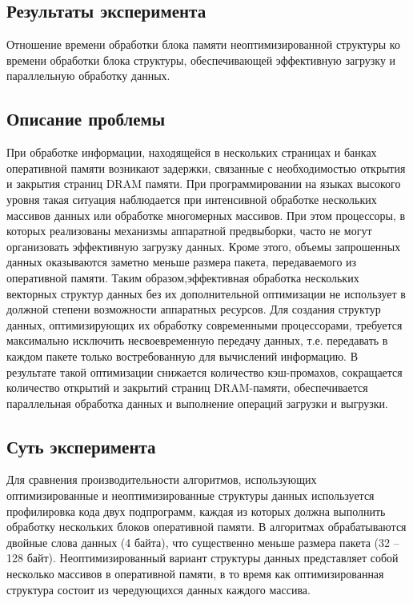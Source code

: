 \subsection{Результаты эксперимента}
Отношение времени обработки блока памяти неоптимизированной структуры ко
времени обработки блока структуры, обеспечивающей эффективную загрузку и
параллельную обработку данных.


\subsection{Описание проблемы}
При обработке информации, находящейся в нескольких страницах и банках
оперативной памяти возникают задержки, связанные с необходимостью открытия и
закрытия страниц DRAM памяти. При программировании на языках высокого уровня
такая ситуация наблюдается при интенсивной обработке нескольких массивов данных
или обработке многомерных массивов. При этом процессоры, в которых реализованы
механизмы аппаратной предвыборки, часто не могут организовать эффективную
загрузку данных. Кроме этого, объемы запрошенных данных оказываются заметно
меньше размера пакета, передаваемого из оперативной памяти. Таким
образом,эффективная обработка нескольких векторных структур данных без их
дополнительной оптимизации не использует в должной степени возможности
аппаратных ресурсов. Для создания структур данных, оптимизирующих их обработку
современными процессорами, требуется максимально исключить несвоевременную
передачу данных, т.е. передавать в каждом пакете только востребованную для
вычислений информацию. В результате такой оптимизации снижается количество
кэш-промахов, сокращается количество открытий и закрытий страниц  DRAM-памяти,
обеспечивается параллельная обработка данных и выполнение операций загрузки и
выгрузки.

\subsection{Суть эксперимента}  
Для сравнения производительности алгоритмов, использующих оптимизированные и
неоптимизированные структуры данных используется профилировка кода двух
подпрограмм, каждая из которых должна выполнить обработку нескольких блоков
оперативной памяти. В алгоритмах обрабатываются двойные слова данных (4 байта),
что существенно меньше размера пакета (32 – 128 байт). Неоптимизированный
вариант структуры данных представляет собой несколько массивов в оперативной
памяти, в то время как оптимизированная структура состоит из чередующихся
данных каждого массива. 


